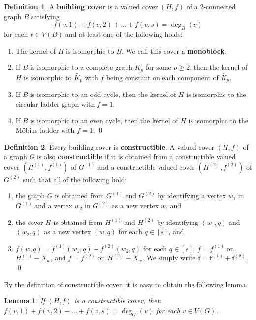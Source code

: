 \documentclass{article}
\newtheorem{lemma}[theorem]{Lemma}
\theoremstyle{definition}
\newtheorem{definition}{Definition}
\begin{document}
\begin{definition}
A \textbf{building cover} is a valued cover $(H, f)$ of a $2$-connected graph $B$ satisfying
\begin{equation*}
f(v, 1) + f(v, 2) + \dots + f(v, s) = \deg_{B}(v)
\end{equation*} 
for each $v \in V(B)$ and at least one of the following holds:  
\begin{enumerate}[label = (\roman*)]
\item The kernel of $H$ is isomorphic to $B$. We call this cover a \textbf{monoblock}. 
\item If $B$ is isomorphic to a complete graph $K_{p}$ for some $p \geq 2$, then the kernel of $H$ is isomorphic to $\widetilde{K_{p}}$ with $f$ being constant on each component of $\widetilde{K_{p}}$. 
\item If $B$ is isomorphic to an odd cycle, then the kernel of $H$ is isomorphic to the circular ladder graph with $f = 1$. 
\item If $B$ is isomorphic to an even cycle, then the kernel of $H$ is isomorphic to the M\"{o}bius ladder with $f = 1$. \qed
\end{enumerate}
\end{definition}

\begin{definition}\label{constructible}
Every building cover is \textbf{constructible}. A valued cover $(H, f)$ of a graph $G$ is also \textbf{constructible} if it is obtained from a constructible valued cover $(H^{(1)}, f^{(1)})$ of $G^{(1)}$ and a constructible valued cover $(H^{(2)}, f^{(2)})$ of $G^{(2)}$ such that all of the following hold: 
\begin{enumerate}[label = (\roman*)]
\item the graph $G$ is obtained from $G^{(1)}$ and $G^{(2)}$ by identifying a vertex $w_{1}$ in $G^{(1)}$ and a vertex $w_{2}$ in $G^{(2)}$ as a new vertex $w$, and
\item the cover $H$ is obtained from $H^{(1)}$ and $H^{(2)}$ by identifying $(w_{1}, q)$ and $(w_{2}, q)$ as a new vertex $(w, q)$ for each $q \in [s]$, and  
\item $f(w, q) = f^{(1)}(w_{1}, q) + f^{(2)}(w_{2}, q)$ for each $q \in [s]$, $f = f^{(1)}$ on $H^{(1)} - X_{w}$, and $f = f^{(2)}$ on $H^{(2)} - X_{w}$. We simply write $\bm{f = f^{(1)} + f^{(2)}}$. \qed
\end{enumerate}
\end{definition}

By the definition of constructible cover, it is easy to obtain the following lemma. 
\begin{lemma}\label{FC}
If $(H, f)$ is a constructible cover, then $f(v, 1) + f(v, 2) + \dots + f(v, s) = \deg_{G}(v)$ for each $v \in V(G)$. 
\end{lemma}
\end{document}
